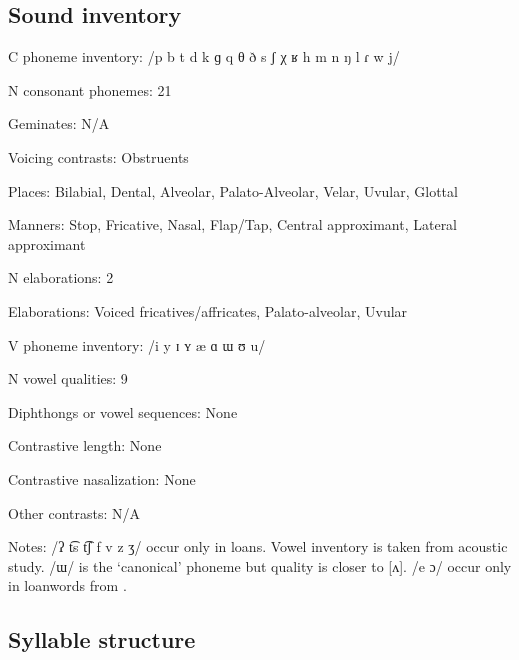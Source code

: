 {\subsection*{Sound inventory}
\begin{appendixdesc}

\item[C phoneme inventory:] /p b t d k ɡ q θ ð s ʃ χ ʁ h m n ŋ l ɾ w j/

\item[N consonant phonemes:] 21

\item[Geminates:] N/A

\item[Voicing contrasts:] Obstruents

\item[Places:] Bilabial, Dental, Alveolar, Palato-Alveolar, Velar, Uvular, Glottal

\item[Manners:] Stop, Fricative, Nasal, Flap/Tap, Central approximant, Lateral approximant

\item[N elaborations:] 2

\item[Elaborations:] Voiced fricatives/affricates, Palato-alveolar, Uvular

\item[V phoneme inventory:] /i y ɪ ʏ æ ɑ ɯ ʊ u/

\item[N vowel qualities:] 9

\item[Diphthongs or vowel sequences:] None

\item[Contrastive length:] None

\item[Contrastive nasalization:] None

\item[Other contrasts:] N/A

\item[Notes:] /ʔ t͡s t͡ʃ f v z ʒ/ occur only in loans. Vowel inventory is taken from \citet{BerksonEtAl2016} acoustic study. /ɯ/ is the ‘canonical’ phoneme but quality is closer to [ʌ]. /e ɔ/ occur only in loanwords from .
\end{appendixdesc}
\subsection*{Syllable structure}
\begin{appendixdesc}


\end{appendixdesc}}
